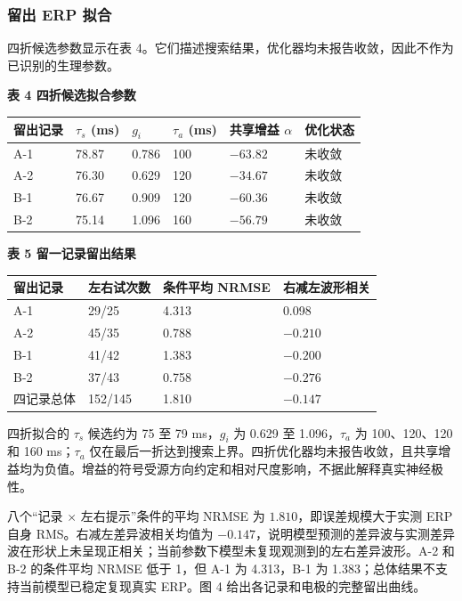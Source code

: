 \subsubsection{留出 ERP 拟合}

四折候选参数显示在表 4。它们描述搜索结果，优化器均未报告收敛，因此不作为已识别的生理参数。


\textbf{表 4 四折候选拟合参数}

\begin{longtable}[]{@{}llllll@{}}
\toprule
留出记录 & \(\tau_s\) (ms) & \(g_i\) & \(\tau_a\) (ms) & 共享增益 \(\alpha\) & 优化状态 \\
\midrule
\endhead
A-1 & 78.87 & 0.786 & 100 & \(-63.82\) & 未收敛 \\
A-2 & 76.30 & 0.629 & 120 & \(-34.67\) & 未收敛 \\
B-1 & 76.67 & 0.909 & 120 & \(-60.36\) & 未收敛 \\
B-2 & 75.14 & 1.096 & 160 & \(-56.79\) & 未收敛 \\
\bottomrule
\end{longtable}

\textbf{表 5 留一记录留出结果}

\begin{longtable}[]{@{}llll@{}}
\toprule
留出记录 & 左右试次数 & 条件平均 NRMSE & 右减左波形相关 \\
\midrule
\endhead
A-1 & 29/25 & 4.313 & 0.098 \\
A-2 & 45/35 & 0.788 & \(-0.210\) \\
B-1 & 41/42 & 1.383 & \(-0.200\) \\
B-2 & 37/43 & 0.758 & \(-0.276\) \\
四记录总体 & 152/145 & 1.810 & \(-0.147\) \\
\bottomrule
\end{longtable}

四折拟合的 \(\tau_s\) 候选约为 75 至 79 ms，\(g_i\) 为 0.629 至 1.096，\(\tau_a\) 为 100、120、120 和 160 ms；\(\tau_a\) 仅在最后一折达到搜索上界。四折优化器均未报告收敛，且共享增益均为负值。增益的符号受源方向约定和相对尺度影响，不据此解释真实神经极性。

八个“记录 \(\times\) 左右提示”条件的平均 NRMSE 为 \(1.810\)，即误差规模大于实测 ERP 自身 RMS。右减左差异波相关均值为 \(-0.147\)，说明模型预测的差异波与实测差异波在形状上未呈现正相关；当前参数下模型未复现观测到的左右差异波形。A-2 和 B-2 的条件平均 NRMSE 低于 1，但 A-1 为 4.313，B-1 为 1.383；总体结果不支持当前模型已稳定复现真实 ERP。图 4 给出各记录和电极的完整留出曲线。

